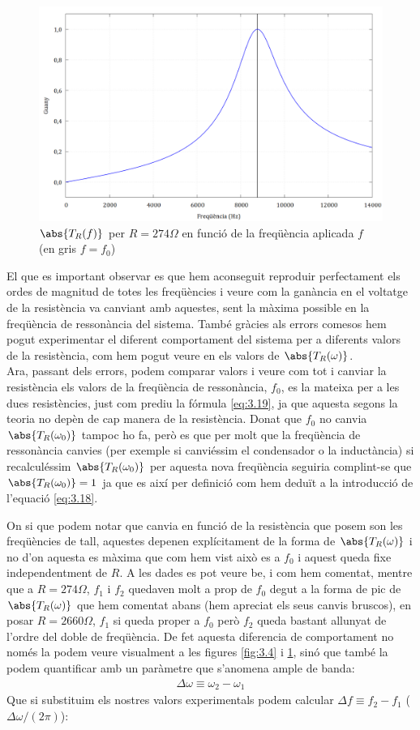 \documentclass[a4paper,10.5pt]{report}
\begin{document}
\begin{figure}[h]
	\centering
	\includegraphics[width=0.6\linewidth]{R274.png}
	\caption{$\abs{T_R(f)}$ per $R = 274\Omega$ en funció de  la freqüència aplicada $f$ (en gris $f=f_0$)}
	\label{fig:3.5}
\end{figure}

El que es important observar es que hem aconseguit reproduir perfectament els ordes de magnitud de totes les freqüències i veure com la ganància en el voltatge de la resistència va canviant amb aquestes, sent la màxima possible en la freqüència de ressonància del sistema. També gràcies als errors comesos hem pogut experimentar el diferent comportament del sistema per a diferents valors de la resistència, com hem pogut veure en els valors de $\abs{T_R(\omega)}$. \\

Ara, passant dels errors, podem comparar valors i veure com tot i canviar la resistència els valors de la freqüència de ressonància, $f_0$, es la mateixa per a les dues resistències, just com prediu la fórmula \ref{eq:3.19}, ja que aquesta segons la teoria no depèn de cap manera de la resistència.  
Donat que $f_0$ no canvia $\abs{T_R(\omega_0)}$ tampoc ho fa, però es que per molt que la freqüència de ressonància canvies (per exemple si canviéssim el condensador o la inductància) si recalculéssim $\abs{T_R(\omega_0)}$ per aquesta nova freqüència seguiria complint-se que $\abs{T_R(\omega_0)} = 1$ ja que es així per definició com hem deduït a la introducció de l'equació \ref{eq:3.18}.

On si que podem notar que canvia en funció de la resistència que posem son les freqüències de tall, aquestes depenen explícitament de la forma de $\abs{T_R(\omega)}$ i no d'on aquesta es màxima que com hem vist això es a $f_0$ i aquest queda fixe independentment de $R$. A les dades es pot veure be, i com hem comentat, mentre que a $R = 274\Omega$, $f_1$ i $f_2$ quedaven molt a prop de $f_0$ degut a la forma de pic de $\abs{T_R(\omega)}$ que hem comentat abans (hem apreciat els seus canvis bruscos), en posar $R = 2660\Omega$, $f_1$ si queda proper a $f_0$ però $f_2$ queda bastant allunyat de l'ordre del doble de freqüència. De fet aquesta diferencia de comportament no només la podem veure visualment a les figures \ref{fig:3.4} i \ref{fig:3.5}, sinó que també la podem quantificar amb un paràmetre que s'anomena ample de banda: 
\begin{eqnarray}
	\Delta\omega \equiv \omega_2 - \omega_1
\end{eqnarray}
Que si substituim els nostres valors experimentals podem calcular $\Delta f \equiv f_2 - f_1$ ($\Delta\omega /(2\pi)$):
\end{document}
